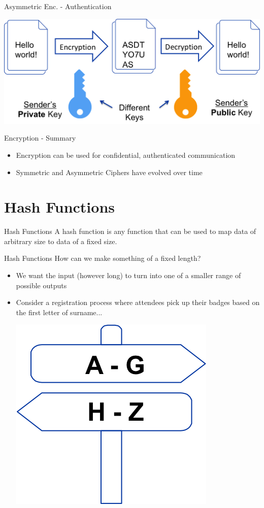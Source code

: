 \documentclass{beamer}
\begin{document}
\begin{frame}{{\color{red}Asymmetric Enc. - Authentication}}
\begin{center}
\includegraphics[width=0.9\linewidth]{asymmetric-authentication.png}
\end{center}
\end{frame}

\begin{frame}{Encryption - Summary}
\begin{itemize}
\item Encryption can be used for confidential, authenticated communication 
\item Symmetric and Asymmetric Ciphers have evolved over time
\end{itemize}
\end{frame}

\section{Hash Functions}
\frame{\sectionpage}

\begin{frame}{Hash Functions}
A hash function is any function that can be used to map data of arbitrary size to data of a fixed size.
\end{frame}

\begin{frame}{Hash Functions}
How can we make something of a fixed length? 
\begin{itemize}
\item We want the input (however long) to turn into one of a smaller range of possible outputs
\item Consider a registration process where attendees pick up their badges based on the first letter of surname... 
\begin{center}
\includegraphics[width=0.3\linewidth]{surname-sort.png}
\end{center}
\end{itemize}
\end{frame}
\end{document}
